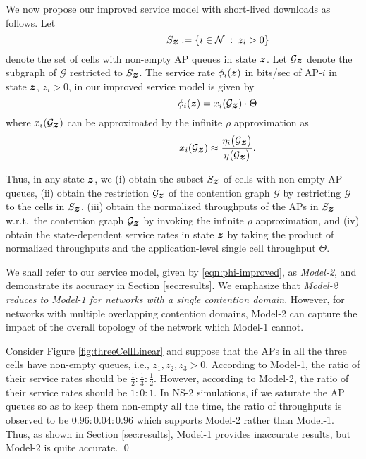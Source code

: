 \documentclass[10pt,a4paper,journal]{IEEEtran}
\theoremstyle{definition}
\theoremstyle{remark}
\theoremstyle{plain}
\newcommand{\bmath}[1]{\mbox{\boldmath$#1$}}
\begin{document}
We now propose our improved service model with short-lived downloads as follows. Let 
\[\quad \quad \quad \quad \quad \quad \quad S_{\bmath{z}} := \{i \in \mathcal{N} \; : \; z_i > 0\}\] 
denote the set of cells with non-empty AP queues in state $\bmath{z}$. Let $\mathcal{G}_{\bmath{z}}$ denote the subgraph of $\mathcal{G}$ restricted to $S_{\bmath{z}}$. The service rate $\phi_i(\bmath{z})$ in bits/sec of AP-$i$ in state $\bmath{z}$, $z_i > 0$, in our improved service model is given by 
\begin{equation}
\label{eqn:phi-improved}
\quad \quad \quad \quad \quad \quad \quad \phi_i(\bmath{z}) = x_i(\mathcal{G}_{\bmath{z}}) \cdot \Theta
\end{equation} 
where $x_i(\mathcal{G}_{\bmath{z}})$ can be approximated by the infinite $\rho$ approximation as 
\begin{equation}
\label{eqn:x_i-non-saturated-AP}
\quad \quad \quad \quad \quad \quad \quad x_i(\mathcal{G}_{\bmath{z}}) \approx \frac{\eta_i\big(\mathcal{G}_{\bmath{z}}\big)}{\eta\big(\mathcal{G}_{\bmath{z}}\big)}.
\end{equation}


Thus, in any state $\bmath{z}$, we (i) obtain the subset $S_{\bmath{z}}$ of cells with non-empty AP queues, (ii) obtain the restriction $\mathcal{G}_{\bmath{z}}$ of the contention graph $\mathcal{G}$ by restricting $\mathcal{G}$ to the cells in $S_{\bmath{z}}$, (iii) obtain the normalized throughputs of the APs in $S_{\bmath{z}}$ w.r.t.~the contention graph $\mathcal{G}_{\bmath{z}}$ by invoking the infinite $\rho$ approximation, and (iv) obtain the state-dependent service rates in state $\bmath{z}$ by taking the product of normalized throughputs and the application-level single cell throughput  $\Theta$. 

We shall refer to our service model, given by \eqref{eqn:phi-improved}, as \textit{Model-2}, and demonstrate its accuracy in Section \ref{sec:results}. We emphasize that \textit{Model-2 reduces to Model-1 for networks with a single contention domain}. However, for networks with multiple overlapping contention domains, Model-2 can capture the impact of the overall topology of the network which Model-1 cannot.


\begin{example}
\label{ex:three-cell-linear}
Consider Figure \ref{fig:threeCellLinear} and suppose that the APs in all the three cells have non-empty queues, i.e., $z_1, z_2, z_3 > 0$. According to Model-1, the ratio of their service rates should be $\frac{1}{2}:\frac{1}{3}:\frac{1}{2}$. However, according to Model-2, the ratio of their service rates should be $1:0:1$. In NS-2 simulations, if we saturate the AP queues so as to keep them non-empty all the time, the ratio of throughputs is observed to be $0.96:0.04:0.96$ which supports Model-2 rather than Model-1. Thus, as shown in Section \ref{sec:results}, Model-1 provides inaccurate results, but Model-2 is quite accurate. \hfill \qed
\end{example}
\end{document}
